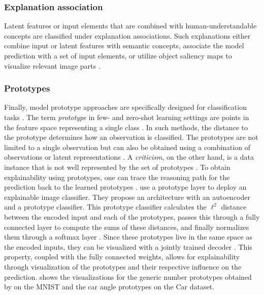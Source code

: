\subsubsection{Explanation association}
Latent features or input elements that are combined with human-understandable concepts are classified under explanation associations. Such explanations either combine input or latent features with semantic concepts, associate the model prediction with a set of input elements, or utilize object saliency maps to visualize relevant image parts \citep{xie2020explainable}.

\subsubsection{Prototypes}
\label{sec:prototypes}

Finally, model prototype approaches are specifically designed for classification tasks \citep{Bien2011, KimRS14, PriebeMDS03, wu2017prototypal}. The term \emph{prototype} in few- and zero-shot learning settings are points in the feature space representing a single class \citep{LiLCR18}. In such methods, the distance to the prototype determines how an observation is classified. The prototypes are not limited to a single observation but can also be obtained using a combination of observations or latent representations \citep{xie2020explainable}. A \emph{criticism}, on the other hand, is a data instance that is not well represented by the set of prototypes \citep{molnar2019}. To obtain explainability using prototypes, one can trace the reasoning path for the prediction back to the learned prototypes \citep{xie2020explainable}. \citet{LiLCR18} use a prototype layer to deploy an explainable image classifier. They propose an architecture with an autoencoder and a prototype classifier. This prototype classifier calculates the $\ell^2$ distance between the encoded input and each of the prototypes, passes this through a fully connected layer to compute the sums of these distances, and finally normalizes them through a softmax layer \citep{LiLCR18}. Since these prototypes live in the same space as the encoded inputs, they can be visualized with a jointly trained decoder \citep{LiLCR18}. This property, coupled with the fully connected weights, allows for explainability through visualization of the prototypes and their respective influence on the prediction.  shows the visualizations for the generic number prototypes obtained by \citet{LiLCR18} on the MNIST \citep{lecun-mnisthandwrittendigit-2010} and the car angle prototypes on the Car \citep{FidlerDU12} dataset.

